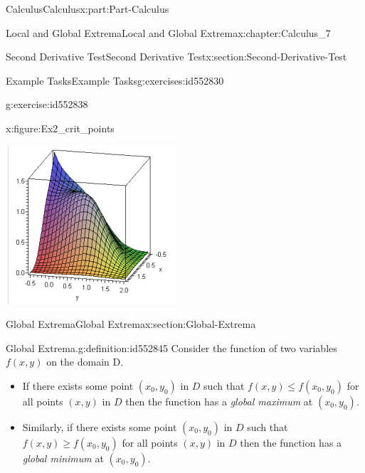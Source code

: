 \documentclass[oneside,10pt,]{book}
\numberwithin{equation}{section}
\begin{document}
\begin{partptx}{Calculus}{}{Calculus}{}{}{x:part:Part-Calculus}
\begin{chapterptx}{Local and Global Extrema}{}{Local and Global Extrema}{}{}{x:chapter:Calculus_7}
\begin{sectionptx}{Second Derivative Test}{}{Second Derivative Test}{}{}{x:section:Second-Derivative-Test}
\begin{exercises-subsection-numberless}{Example Tasks}{}{Example Tasks}{}{}{g:exercises:id552830}
\begin{divisionexercise}{2}{}{}{g:exercise:id552838}
\begin{figureptx}{}{x:figure:Ex2_crit_points}{}
\begin{image}{0.15}{0.7}{0.15}
\includegraphics[width=\linewidth]{./Calculus/Images/7/Ex2_crit_points.png}
\end{image}%
\tcblower
\end{figureptx}%
\end{divisionexercise}%
\end{exercises-subsection-numberless}
\end{sectionptx}
%
%
\typeout{************************************************}
\typeout{************************************************}
%
\begin{sectionptx}{Global Extrema}{}{Global Extrema}{}{}{x:section:Global-Extrema}
\begin{definition}{Global Extrema.}{g:definition:id552845}%
Consider the function of two variables \(f(x,y)\) on the domain D.%
\par
%
\begin{itemize}[label=\textbullet]
\item{}If there exists some point \((x_0,y_0)\) in \(D\) such that \(f(x,y) \leq f(x_0,y_0)\) for all points \((x,y)\) in \(D\) then the function has a \emph{global maximum} at \((x_0,y_0)\).%
\item{}Similarly, if there exists some point \((x_0,y_0)\) in \(D\) such that \(f(x,y) \geq f(x_0,y_0)\) for all points \((x,y)\) in \(D\) then the function has a \emph{global minimum} at \((x_0,y_0)\).%
\end{itemize}

\end{definition}
\end{sectionptx}
\end{chapterptx}
\end{partptx}
\end{document}
